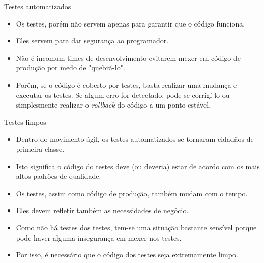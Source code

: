 \documentclass[11pt]{beamer}
\begin{document}
  \begin{frame}{Testes automatizados}
    \begin{itemize}
      \item Os testes, porém não servem apenas para garantir que o código funciona.
      \item Eles servem para dar segurança ao programador.
      \item Não é incomum times de desenvolvimento evitarem mexer em código de produção por medo de "quebrá-lo".
      \item Porém, se o código é coberto por testes, basta realizar uma mudança e executar os testes. Se algum erro for detectado, pode-se corrigí-lo ou simplesmente realizar o \textit{rollback} do código a um ponto estável.
    \end{itemize}
  \end{frame}

  \begin{frame}{Testes limpos}
    \begin{itemize}
      \item Dentro do movimento ágil, os testes automatizados se tornaram cidadãos de primeira classe.
      \item Isto significa o código do testes deve (ou deveria) estar de acordo com os mais altos padrões de qualidade.
      \item Os testes, assim como código de produção, também mudam com o tempo.
      \item Eles devem refletir também as necessidades de negócio.
      \item Como não há testes dos testes, tem-se uma situação bastante sensível porque pode haver alguma insegurança em mexer nos testes.
      \item Por isso, é necessário que o código dos testes seja extremamente limpo. 
    \end{itemize}
  \end{frame}
\end{document}
